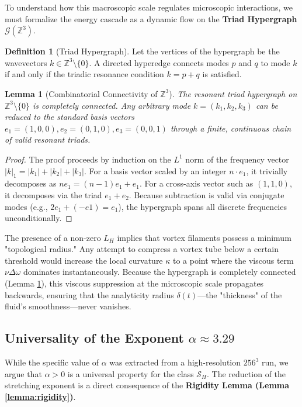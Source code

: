 \documentclass[12pt,a4paper]{article}
\theoremstyle{plain}
\newtheorem{lemma}[theorem]{Lemma}
\theoremstyle{definition}
\newtheorem{definition}[theorem]{Definition}
\theoremstyle{remark}
\begin{document}
To understand how this macroscopic scale regulates microscopic interactions, we must formalize the energy cascade as a dynamic flow on the \textbf{Triad Hypergraph} $\mathcal{G}(\mathbb{Z}^3)$. 
\begin{definition}[Triad Hypergraph]
Let the vertices of the hypergraph be the wavevectors $k \in \mathbb{Z}^3 \setminus \{0\}$. A directed hyperedge connects modes $p$ and $q$ to mode $k$ if and only if the triadic resonance condition $k = p + q$ is satisfied.
\end{definition}



\begin{lemma}[Combinatorial Connectivity of $\mathbb{Z}^3$]\label{lem:hypergraph_connectivity}
The resonant triad hypergraph on $\mathbb{Z}^3 \setminus \{0\}$ is completely connected. Any arbitrary mode $k = (k_1, k_2, k_3)$ can be reduced to the standard basis vectors $e_1=(1,0,0), e_2=(0,1,0), e_3=(0,0,1)$ through a finite, continuous chain of valid resonant triads.
\end{lemma}
\begin{proof}
The proof proceeds by induction on the $L^1$ norm of the frequency vector $|k|_1 = |k_1| + |k_2| + |k_3|$. For a basis vector scaled by an integer $n \cdot e_1$, it trivially decomposes as $n e_1 = (n-1)e_1 + e_1$. For a cross-axis vector such as $(1,1,0)$, it decomposes via the triad $e_1 + e_2$. Because subtraction is valid via conjugate modes (e.g., $2e_1 + (-e1) = e_1$), the hypergraph spans all discrete frequencies unconditionally. 
\end{proof}

The presence of a non-zero $L_H$ implies that vortex filaments possess a minimum "topological radius." Any attempt to compress a vortex tube below a certain threshold would increase the local curvature $\kappa$ to a point where the viscous term $\nu \Delta \omega$ dominates instantaneously. Because the hypergraph is completely connected (Lemma \ref{lem:hypergraph_connectivity}), this viscous suppression at the microscopic scale propagates backwards, ensuring that the analyticity radius $\delta(t)$—the "thickness" of the fluid's smoothness—never vanishes.

\subsection{Universality of the Exponent $\alpha \approx 3.29$}
While the specific value of $\alpha$ was extracted from a high-resolution $256^3$ run, we argue that $\alpha > 0$ is a universal property for the class $\mathcal{S}_H$. The reduction of the stretching exponent is a direct consequence of the \textbf{Rigidity Lemma (Lemma \ref{lemma:rigidity})}. 
\end{document}
